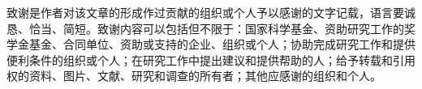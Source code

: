 
\begin{acknowledgements}
    致谢是作者对该文章的形成作过贡献的组织或个人予以感谢的文字记载，语言要诚恳、恰当、简短。致谢内容可以包括但不限于：国家科学基金、资助研究工作的奖学金基金、合同单位、资助或支持的企业、组织或个人；协助完成研究工作和提供便利条件的组织或个人；在研究工作中提出建议和提供帮助的人；给予转载和引用权的资料、图片、文献、研究和调查的所有者；其他应感谢的组织和个人。
\end{acknowledgements}